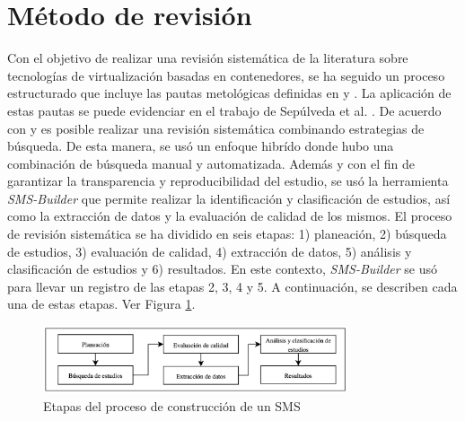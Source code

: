 \section{Método de revisión}
Con el objetivo de realizar una revisión sistemática de la literatura sobre tecnologías de virtualización basadas en contenedores, se ha seguido un proceso estructurado que incluye las pautas metológicas definidas en \cite{Runeson2009} y \cite{Kitchenham2010}.
La aplicación de estas pautas se puede evidenciar en el trabajo de Sepúlveda et al. \cite{Sepulveda-Rodriguez2021}. De acuerdo con \cite{Mourao2017} y \cite{Nguyen2015} es posible realizar una revisión sistemática combinando estrategias de búsqueda. De esta manera, se usó un enfoque hibrído donde hubo una combinación de búsqueda manual y automatizada. 
Además y con el fin de garantizar la transparencia y reproducibilidad del estudio, se usó la herramienta \textit{SMS-Builder} \cite{Candela-Uribe2022} que permite realizar la identificación y clasificación de estudios, así como la extracción de datos y la evaluación de calidad de los mismos.
El proceso de revisión sistemática se ha dividido en seis etapas: 1) planeación, 2) búsqueda de estudios, 3) evaluación de calidad, 4) extracción de datos, 5) análisis y clasificación de estudios y 6) resultados. En este contexto, \textit{SMS-Builder} se usó para llevar un registro de las etapas 2, 3, 4 y 5. A continuación, se describen cada una de estas etapas. Ver Figura \ref{fig:etapas}.


\begin{figure}[htbp]
    \centering
    \includegraphics[width=0.8\textwidth]{resources/images/planeacion/planeacion.png}
    \caption{Etapas del proceso de construcción de un SMS}\label{fig:etapas}
\end{figure}












